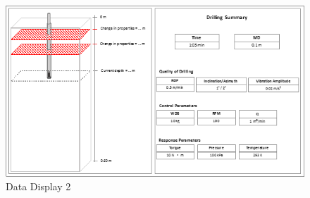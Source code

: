 \begin{figure} [H]
\centering
\includegraphics[width=1.0\textwidth]{figures/datadisplay2.png}
\caption{Data Display 2}
\label{fig:datadisplay2}
\end{figure}
